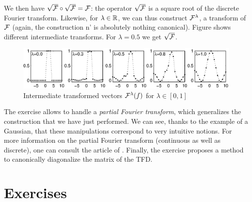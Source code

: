 We then have $ \sqrt{\mathcal{F}} \circ \sqrt{\mathcal{F}} = \mathcal{F} $: the operator $ \sqrt{\mathcal{F}} $ is a square root of the discrete Fourier transform. Likewise, for $ \lambda \in \mathbb{R} $, we can thus construct $ \mathcal{F}^\lambda $, a  transform of $ \mathcal{F} $ (again, the construction n' is absolutely nothing canonical). Figure  shows different intermediate transforms. For $ \lambda = 0.5 $ we get $ \sqrt{\mathcal{F}} $. \begin{figure}[ht]
    \begin{center}
    \includegraphics [scale = 0.7]{images/racine-interm-tfd.eps}
    \end{center}
    \caption{Intermediate transformed vectors $ \mathcal{F}^\lambda (f) $ for $ \lambda \in [0,1] $}
              \label{fig-root-interm-tfd}
\end{figure}
The exercise  allows to handle a \textit{partial Fourier transform}, which generalizes the construction that we have just performed. We can see, thanks to the example of a Gaussian, that these manipulations correspond to very intuitive notions. For more information on the partial Fourier transform (continuous as well as discrete), one can consult the article of  \cite{cariolaro-partial-fourier}. Finally, the exercise  proposes a method to canonically diagonalize the matrix of the TFD.

\section{Exercises}
\label{sect1-chap2-exercises} 
 
 
 
